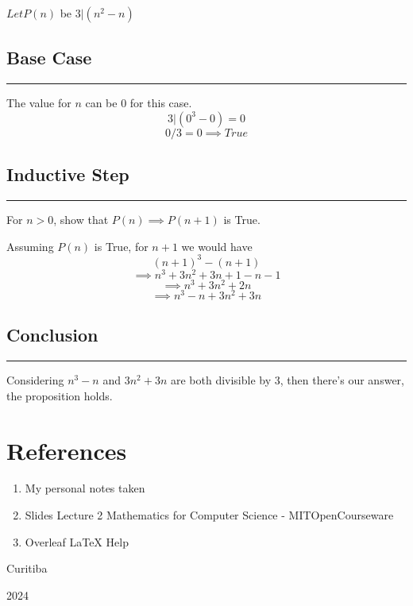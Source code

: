 \documentclass{article}
\begin{document}
$Let P(n)$ be $3|(n^{2} - n)$

\subsection*{Base Case}
\hrule
\vspace{0.2cm}
The value for $n$ can be 0 for this case.
\[3 | (0^{3} - 0) = 0\]
\[0/3 = 0 \implies True\]

\subsection*{Inductive Step}
\hrule
\vspace{0.2cm}

For $n > 0$, show that $P(n) \implies
P(n+1)$ is True.

Assuming $P(n)$ is True, for $n+1$ we would have
\[(n+1)^{3} - (n+1)\]
\[\implies n^{3} + 3n^{2} + 3n + 1 - n - 1\]
\[\implies n^{3} +3n^{2} + 2n\]
\[\implies n^{3} - n + 3n^{2} + 3n\]

\subsection*{Conclusion}
\hrule
\vspace{0.2cm}
Considering $n^{3} - n$ and $3n^{2} + 3n$ are both divisible by 3,
then there's our answer, the proposition holds.

\newpage
\thispagestyle{headings}
\section{References}
\begin{enumerate}
  \item My personal notes taken
  \item Slides Lecture 2 Mathematics for Computer Science - MITOpenCourseware
  \item Overleaf LaTeX Help
\end{enumerate}

\vfill
\begin{center}
  Curitiba

  2024
\end{center}
\end{document}
